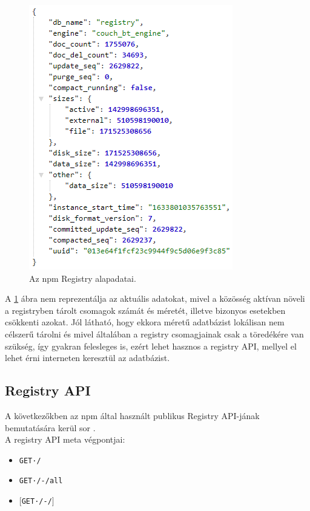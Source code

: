 \begin{figure}[h]
	\centering
	\includegraphics[scale=0.75]{images/registry_data.png}
	\caption{Az npm Registry alapadatai.}
	\label{fig:registry}
\end{figure}

\pagebreak

A \ref{fig:registry} ábra nem reprezentálja az aktuális adatokat, mivel a közösség aktívan növeli a registryben tárolt csomagok számát és méretét, illetve bizonyos esetekben csökkenti azokat. Jól látható, hogy ekkora méretű adatbázist lokálisan nem célszerű tárolni és mivel általában a registry csomagjainak csak a töredékére van szükség, így gyakran felesleges is, ezért lehet hasznos a registry API, mellyel el lehet érni interneten keresztül az adatbázist.\\

\subsection{Registry API}

A következőkben az npm által használt publikus Registry API-jának bemutatására kerül sor \cite{npm-registry-api}.\\

\noindent A registry API meta végpontjai:

\begin{itemize}
	\item \texttt{GET·/}
	\item \texttt{GET·/-/all}
	\item \texttt{$\big[$GET·/-/$\big]$}
\end{itemize}

